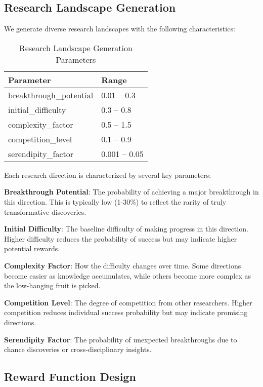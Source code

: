 \documentclass[letterpaper]{article}
\begin{document}
\subsection{Research Landscape Generation}

We generate diverse research landscapes with the following characteristics:

\begin{table}[h]
\centering
\begin{tabular}{ll}
\toprule
\textbf{Parameter} & \textbf{Range} \\
\midrule
breakthrough\_potential & 0.01 -- 0.3 \\
initial\_difficulty & 0.3 -- 0.8 \\
complexity\_factor & 0.5 -- 1.5 \\
competition\_level & 0.1 -- 0.9 \\
serendipity\_factor & 0.001 -- 0.05 \\
\bottomrule
\end{tabular}
\caption{Research Landscape Generation Parameters}
\end{table}

Each research direction is characterized by several key parameters:

\textbf{Breakthrough Potential}: The probability of achieving a major breakthrough in this direction. This is typically low (1-30\%) to reflect the rarity of truly transformative discoveries.

\textbf{Initial Difficulty}: The baseline difficulty of making progress in this direction. Higher difficulty reduces the probability of success but may indicate higher potential rewards.

\textbf{Complexity Factor}: How the difficulty changes over time. Some directions become easier as knowledge accumulates, while others become more complex as the low-hanging fruit is picked.

\textbf{Competition Level}: The degree of competition from other researchers. Higher competition reduces individual success probability but may indicate promising directions.

\textbf{Serendipity Factor}: The probability of unexpected breakthroughs due to chance discoveries or cross-disciplinary insights.

\subsection{Reward Function Design}
\end{document}
